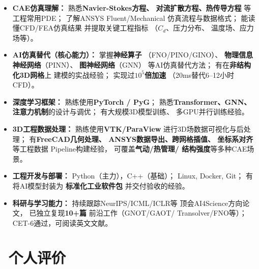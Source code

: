 \documentclass[11pt]{article}
\begin{document}
\begin{itemize}
    \item \textbf{CAE仿真理解：}
    熟悉\textbf{Navier-Stokes方程、
    对流扩散方程、热传导方程}
    等工程常用PDE；
    了解ANSYS Fluent/Mechanical
    仿真流程与数据格式；
    能读懂CFD/FEA仿真结果
    并提取关键工程指标
    （$C_d$、压力分布、
    温度场、应力场等）。
    
    \item \textbf{AI仿真替代（核心能力）：}
    掌握\textbf{神经算子}
    （FNO/PINO/GINO）、
    \textbf{物理信息神经网络}（PINN）、
    \textbf{图神经网络}（GNN）
    等AI仿真替代方法；
    有在\textbf{非结构化3D网格}上
    建模的实战经验；
    实现过\textbf{$10^5$倍加速}
    （20ms替代6--12小时CFD）。
    
    \item \textbf{深度学习框架：}
    熟练使用\textbf{PyTorch / PyG}；
    熟悉\textbf{Transformer、GNN、
    注意力机制}的设计与调优；
    有大规模3D模型训练、
    多GPU并行训练经验。
    
    \item \textbf{3D工程数据处理：}
    熟练使用\textbf{VTK/ParaView}
    进行3D场数据可视化与后处理；
    有\textbf{FreeCAD几何处理、
    ANSYS数据导出、跨网格插值、
    坐标系对齐}等工程数据
    Pipeline构建经验，
    可覆盖\textbf{气动/热管理/
    结构强度}等多种CAE场景。
    
    \item \textbf{工程开发与部署：}
    Python（主力），C++（基础）；
    Linux, Docker, Git；
    有将AI模型封装为
    \textbf{标准化工业软件包}
    并交付验收的经验。
    
    \item \textbf{科研与学习能力：}
    持续跟踪NeurIPS/ICML/ICLR等
    顶会AI4Science方向论文，
    已独立复现\textbf{10+篇}
    前沿工作（GNOT/GAOT/
    Transolver/FNO等）；
    CET-6通过，可阅读英文文献。
\end{itemize}
\section{\makebox[\widthof{\faUser}][c]
{\color{CVBlue}\faUser}\ 个人评价}
\end{document}
